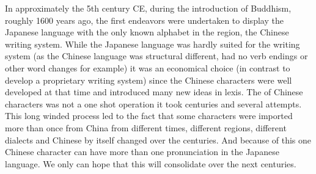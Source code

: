 

In approximately the 5th century CE, during the introduction of Buddhism,
roughly 1600 years ago, the first endeavors were undertaken to display the
Japanese language with the only known alphabet in the region, the Chinese
writing system. While the Japanese language was hardly suited for the writing
system (as the  Chinese language was structural different, had no verb endings
or other word changes for example) it was an economical choice (in contrast to
develop a proprietary writing system) since the Chinese characters were well
developed at that time and introduced many new ideas in lexis. The
 of Chinese characters was not a one shot operation it
took centuries and several attempts. This long winded process led to the fact
that some characters were imported more than once from China from different
times, different regions, different dialects and Chinese by itself changed over
the centuries. And because of this one Chinese character can have more than
one pronunciation in the Japanese language. We only can hope that this will
consolidate over the next centuries.

